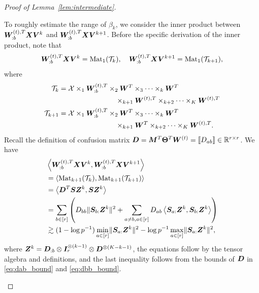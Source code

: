 \documentclass[journal]{IEEEtran}
\theoremstyle{definition}
\theoremstyle{definition}
\newcommand{\of}[1]{\left(#1\right)}
\newcommand{\ang}[1]{\left\langle#1\right\rangle}
\begin{document}
\begin{proof}[Proof of Lemma~\ref{lem:intermediate}]
\begin{enumerate}[wide]
    To roughly estimate the range of $\beta_k$, we consider the inner product between $\bm{W}_{:b}^{(t),T} \bm X \bm{V}^k$ and $\bm{W}_{:b}^{(t),T} \bm X \bm{V}^{k+1}$. Before the specific derivation of the inner product, note that 
    \begin{equation}
        \bm{W}_{:b}^{(t),T} \bm X \bm{V}^k = \text{Mat}_1(\mathcal{T}_k), \quad  \bm{W}_{:b}^{(t),T} \bm X \bm{V}^{k+1} = \text{Mat}_1(\mathcal{T}_{k+1}),
    \end{equation}
    where 
    \begin{align}
        \mathcal{T}_k &= \mathcal{X} \times_1  \bm{W}_{:b}^{(t),T} \times_2 \bm{W}^T \times_3 \cdots \times_k \bm{W}^T  \\
        & \quad \quad  \quad \quad \quad \quad \quad \quad \times_{k+1} \bm{W}^{(t),T} \times_{k+2} \cdots \times_K \bm{W}^{(t),T}\\
        \mathcal{T}_{k+1} &= \mathcal{X} \times_1  \bm{W}_{:b}^{(t),T} \times_2 \bm{W}^T \times_3 \cdots \times_k \bm{W}^T \\
        & \quad \quad  \quad \quad \quad \quad \quad \quad \times_{k+1} \bm{W}^{T} \times_{k+2} \cdots \times_K \bm{W}^{(t),T}. 
    \end{align}
    Recall the definition of confusion matrix $\bm{D} = \bm M^T \boldsymbol{\Theta}^T \bm{W}^{(t)} = \llbracket D_{ab} \rrbracket \in \mathbb{R}^{r \times r}$.
 We have 
 \small
    \begin{align}
         &\ang{\mW_{:b}^{(t),T} \mX \mV^k , \mW_{:b}^{(t),T} \mX \mV^{k+1}} \\
         &  =\ang{ \mat_{k+1}(\tT_k), \mat_{k+1}(\tT_{k+1}) } \label{eq:j11_tensormat} \\
  & =  \ang{ \mD^T \mS \mZ^k ,  \mS \mZ^k   }\\
         & = \sum_{b \in [r]} \of{ D_{bb} \onormSize{}{\mS_{b:}\mZ^k}^2 + \sum_{a \neq b, a \in [r]} D_{ab} \ang{\mS_{a:} \mZ^k, \mS_{b:} \mZ^k}} \\
         & \gtrsim (1 - \log p^{-1}) \min_{a \in [r]}\onormSize{}{\mS_{a:}\mZ^k}^2 - \log p^{-1} \max_{a \in [r]} \onormSize{}{\mS_{a:}\mZ^k}^2, \label{eq:j11inner}
    \end{align}
    \normalsize
    where $\bm Z^k = \bm{D}_{:b} \otimes \bm I_r^{\otimes (k-1)} \otimes  \bm{D}^{\otimes (K-k-1)}$, the equations follow by the tensor algebra and definitions, and the last inequality follows from the bounds of $\bm{D}$ in \eqref{eq:dab_bound} and \eqref{eq:dbb_bound}. 
    

\end{enumerate}
\end{proof}
\end{document}
